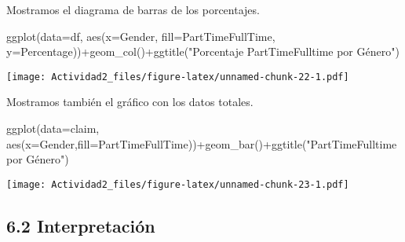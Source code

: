 \documentclass[
  a4paper]{article}
\newenvironment{Shaded}{\begin{snugshade}}{\end{snugshade}}
\newcommand{\AttributeTok}[1]{\textcolor[rgb]{0.77,0.63,0.00}{#1}}
\newcommand{\DecValTok}[1]{\textcolor[rgb]{0.00,0.00,0.81}{#1}}
\newcommand{\FunctionTok}[1]{\textcolor[rgb]{0.00,0.00,0.00}{#1}}
\newcommand{\NormalTok}[1]{#1}
\newcommand{\OtherTok}[1]{\textcolor[rgb]{0.56,0.35,0.01}{#1}}
\newcommand{\SpecialCharTok}[1]{\textcolor[rgb]{0.00,0.00,0.00}{#1}}
\newcommand{\StringTok}[1]{\textcolor[rgb]{0.31,0.60,0.02}{#1}}
\begin{document}
\begin{Shaded}
\end{Shaded}

Mostramos el diagrama de barras de los porcentajes.

\begin{Shaded}
\begin{Highlighting}[]
\FunctionTok{ggplot}\NormalTok{(}\AttributeTok{data=}\NormalTok{df, }\FunctionTok{aes}\NormalTok{(}\AttributeTok{x=}\NormalTok{Gender, }\AttributeTok{fill=}\NormalTok{PartTimeFullTime, }\AttributeTok{y=}\NormalTok{Percentage))}\SpecialCharTok{+}\FunctionTok{geom\_col}\NormalTok{()}\SpecialCharTok{+}\FunctionTok{ggtitle}\NormalTok{(}\StringTok{"Porcentaje PartTimeFulltime por Género"}\NormalTok{)}
\end{Highlighting}
\end{Shaded}

\texttt{[image: Actividad2\_files/figure-latex/unnamed-chunk-22-1.pdf]}

Mostramos también el gráfico con los datos totales.

\begin{Shaded}
\begin{Highlighting}[]
\FunctionTok{ggplot}\NormalTok{(}\AttributeTok{data=}\NormalTok{claim, }\FunctionTok{aes}\NormalTok{(}\AttributeTok{x=}\NormalTok{Gender,}\AttributeTok{fill=}\NormalTok{PartTimeFullTime))}\SpecialCharTok{+}\FunctionTok{geom\_bar}\NormalTok{()}\SpecialCharTok{+}\FunctionTok{ggtitle}\NormalTok{(}\StringTok{"PartTimeFulltime por Género"}\NormalTok{)}
\end{Highlighting}
\end{Shaded}

\texttt{[image: Actividad2\_files/figure-latex/unnamed-chunk-23-1.pdf]}

\hypertarget{interpretaciuxf3n-1}{%
\subsection{6.2 Interpretación}\label{interpretaciuxf3n-1}}
\end{document}
